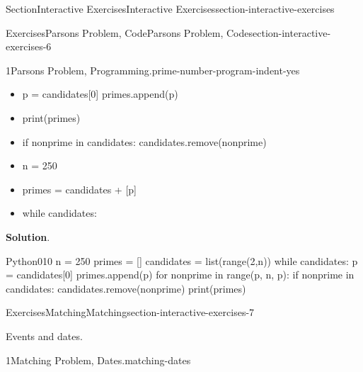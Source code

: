 \documentclass[twoside,10pt,]{article}
\newcommand{\blocktitlefont}{\relax}
\numberwithin{equation}{section}
\begin{document}
\begin{sectionptx}{Section}{Interactive Exercises}{}{Interactive Exercises}{}{}{section-interactive-exercises}
\begin{exercises-subsection}{Exercises}{Parsons Problem, Code}{}{Parsons Problem, Code}{}{}{section-interactive-exercises-6}
\begin{divisionexercise}{1}{Parsons Problem, Programming.}{}{prime-number-program-indent-yes}
\begin{itemize}[label=\textbullet]
\begin{itemize}[label=]
%
\begin{codedisplay}
candidates = []
primes = list(range(2,n))
\end{codedisplay}
%
\end{itemize}
%
\item{}%
\begin{codedisplayleft}
p = candidates[0]
primes.append(p)
\end{codedisplayleft}
%
\item{}%
\begin{codedisplayleft}
print(primes)
\end{codedisplayleft}
%
\item{}%
\begin{codedisplayleft}
if nonprime in candidates:
    candidates.remove(nonprime)
\end{codedisplayleft}
%
\item{}%
\begin{codedisplayleft}
n = 250
\end{codedisplayleft}
%
\item{}%
\begin{codedisplayleft}
primes = candidates + [p]
\end{codedisplayleft}
%
\item{}%
\begin{codedisplayleft}
while candidates:
\end{codedisplayleft}
%
\end{itemize}
%
\par\smallskip%
\noindent\textbf{\blocktitlefont Solution}.\hypertarget{prime-number-program-indent-yes-5}{}\quad{}\begin{program}{Python}{0}{1}{0}
n = 250
primes = []
candidates = list(range(2,n))
while candidates:
    p = candidates[0]
    primes.append(p)
    for nonprime in range(p, n, p):
        if nonprime in candidates:
            candidates.remove(nonprime)
print(primes)
\end{program}
\end{divisionexercise}%
\end{exercises-subsection}
%
%
\typeout{************************************************}
\typeout{************************************************}
%
\begin{exercises-subsection}{Exercises}{Matching}{}{Matching}{}{}{section-interactive-exercises-7}
\begin{introduction}{}%
Events and dates.%
\end{introduction}%
\begin{divisionexercise}{1}{Matching Problem, Dates.}{}{matching-dates}%

\end{divisionexercise}
\end{exercises-subsection}
\end{sectionptx}
\end{document}
